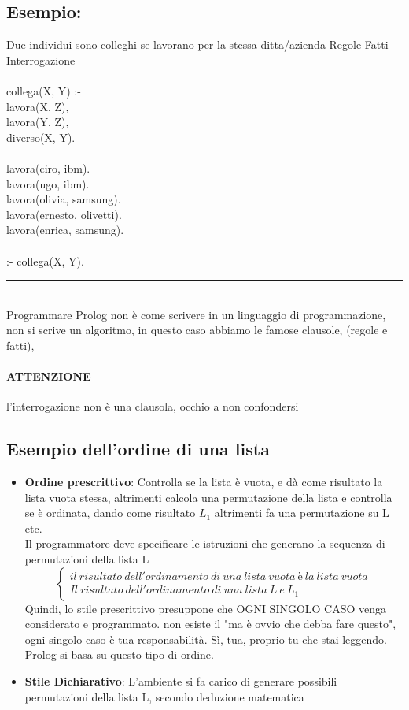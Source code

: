 \documentclass[12pt, a4paper, openany, oneside]{book}
\newcommand\tab[1][1cm]{\hspace*{#1}}
\begin{document}
\subsection{Esempio:}
Due individui sono colleghi se lavorano per la stessa ditta/azienda
\color{red} Regole \color{blue} Fatti \color{black} Interrogazione
\\ \\
\color{red}
collega(X, Y) :-  \\	
\tab lavora(X, Z), \\	
\tab lavora(Y, Z), \\	
\tab diverso(X, Y).
\\ \\
\color{blue}
lavora(ciro, ibm).  \\
lavora(ugo, ibm).  \\
lavora(olivia, samsung).  \\
lavora(ernesto, olivetti).  \\
lavora(enrica, samsung).
\\ \\
\color{black}
:- collega(X, Y). 
\\
{\color{black} \rule{\linewidth}{0.3mm} }
\\
Programmare Prolog non è come scrivere in un linguaggio di programmazione, non
si scrive un algoritmo, in questo caso abbiamo le famose clausole, (regole e 
fatti), 
\paragraph{ATTENZIONE} l'interrogazione non è una clausola, occhio a non confondersi
\subsection{Esempio dell'ordine di una lista}
\begin{itemize}
	\item \textbf{Ordine prescrittivo}: Controlla se la lista è vuota, e dà come 
	risultato la lista vuota stessa, altrimenti calcola una permutazione della 
	lista e controlla se è ordinata, dando come risultato $L_{1}$ altrimenti 
	fa una permutazione su L etc.
	\\
	Il programmatore deve specificare le istruzioni che generano la sequenza 
	di permutazioni della lista L
	\[
	\begin{cases}
	il ~ risultato ~ dell'ordinamento ~ di ~ una ~ lista ~ vuota ~ è ~ la ~ 
	lista ~ vuota \\
	Il ~ risultato ~ dell'ordinamento ~ di ~ una ~ lista ~ L ~ e ~ L_{1} 
	\end{cases}
	\]
	Quindi, lo stile prescrittivo presuppone che OGNI SINGOLO CASO venga considerato
	e programmato. non esiste il "ma è ovvio che debba fare questo", ogni singolo
	caso è tua responsabilità. Sì, tua, proprio tu che stai leggendo. Prolog si
	basa su questo tipo di ordine.
	\item \textbf{Stile Dichiarativo}: L'ambiente si fa carico di generare 
	possibili permutazioni della lista L, secondo deduzione matematica
\end{itemize}
\end{document}
